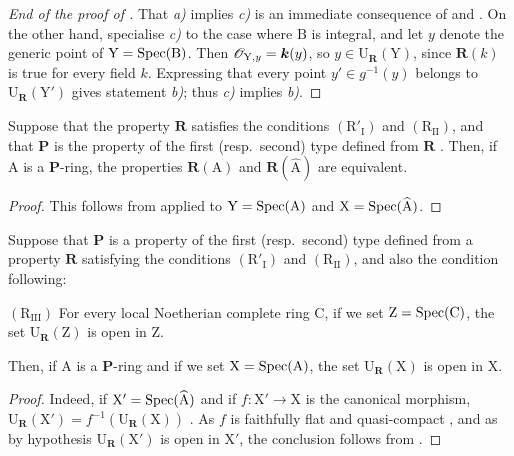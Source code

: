 \begin{proof}[End of the proof of ]
That \emph{a)} implies \emph{c)} is an immediate consequence of  and .
On the other hand, specialise \emph{c)} to the case where $\mathrm{B}$ is integral, and let $y$ denote the generic point of $\mathrm{Y}=\operatorname{Spec}(\mathrm{B})$.
Then $\mathscr{O}_{\mathrm{Y},y}=\boldsymbol{k}(y)$, so $y\in\mathrm{U}_{\mathbf{R}}(\mathrm{Y})$, since $\boldsymbol{R}(k)$ is true for every field $k$.
Expressing that every point $y'\in g^{-1}(y)$ belongs to $\mathrm{U}_{\mathbf{R}}(\mathrm{Y}')$ gives statement \emph{b)}; thus \emph{c)} implies \emph{b)}.
\end{proof}

\begin{proposition}[7.3.17]
\label{IV.7.3.17}
Suppose that the property $\boldsymbol{R}$ satisfies the conditions $(\mathrm{R}'_\mathrm{I})$ and $(\mathrm{R_{II}})$, and that $\boldsymbol{P}$ is the property of the first \textup{(resp.}~second) type defined from $\boldsymbol{R}$ .
Then, if $\mathrm{A}$ is a $\boldsymbol{P}$-ring, the properties $\boldsymbol{R}(\mathrm{A})$ and $\boldsymbol{R}(\widehat{\mathrm{A}})$ are equivalent.
\end{proposition}

\begin{proof}
This follows from  applied to $\mathrm{Y}=\operatorname{Spec}(\mathrm{A})$ and $\mathrm{X}=\operatorname{Spec}(\widehat{\mathrm{A}})$.
\end{proof}

\begin{proposition}[7.3.18]
\label{IV.7.3.18}
Suppose that $\boldsymbol{P}$ is a property of the first \textup{(resp.}~second) type defined from a property $\boldsymbol{R}$ satisfying the conditions $(\mathrm{R}'_\mathrm{I})$ and $(\mathrm{R_{II}})$, and also the condition following:

$(\mathrm{R_{III}})$ For every local Noetherian \textup{complete} ring $\mathrm{C}$, if we set $\mathrm{Z}=\operatorname{Spec}(\mathrm{C})$, the set $\mathrm{U}_{\mathbf{R}}(\mathrm{Z})$  is open in $\mathrm{Z}$.

Then, if $\mathrm{A}$ is a $\boldsymbol{P}$-ring and if we set $\mathrm{X}=\operatorname{Spec}(\mathrm{A})$, the set $\mathrm{U}_{\mathbf{R}}(\mathrm{X})$ is open in $\mathrm{X}$.
\end{proposition}

\begin{proof}
Indeed, if $\mathrm{X}'=\operatorname{Spec}(\widehat{\mathrm{A}})$ and if $f:\mathrm{X}'\to\mathrm{X}$ is the canonical morphism, $\mathrm{U}_{\mathbf{R}}(\mathrm{X}')=f^{-1}(\mathrm{U}_{\mathbf{R}}(\mathrm{X}))$ .
As $f$ is faithfully flat and quasi-compact , and as by hypothesis $\mathrm{U}_{\mathbf{R}}(\mathrm{X}')$ is open in $\mathrm{X}'$, the conclusion follows from .
\end{proof}

